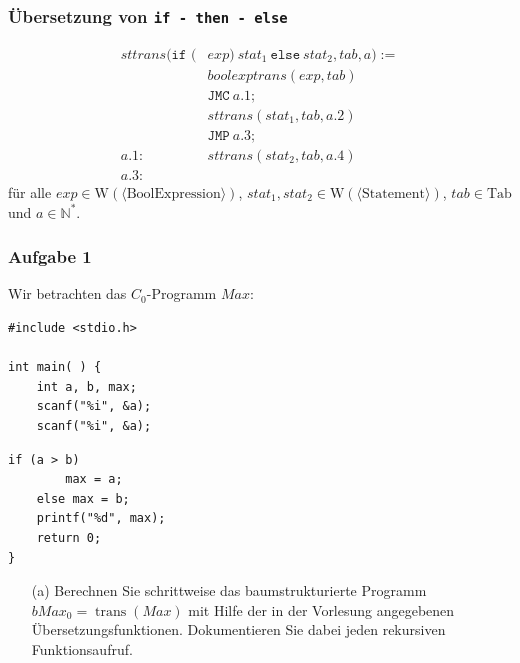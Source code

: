 \documentclass{beamer}
\DeclareMathOperator{\trans}{trans}
\begin{document}
\begin{frame} \frametitle{Übersetzung von \texttt{if - then - else}}
	\small \centering
	\begin{align*}
	sttrans( \texttt{if (} &exp \texttt{)} \ stat_1 \ \texttt{else} \ stat_2, tab, a) := \\
	& boolexptrans(exp, tab) \\
	&\texttt{JMC} \ a.1 ; \\
	& sttrans(stat_1, tab, a.2) \\
	&\texttt{JMP} \ a.3; \\
	a.1: \quad & sttrans(stat_2, tab, a.4) \\
	a.3: \quad & \phantom{.}
	\end{align*}
	für alle $exp \in \mathrm{W}(\langle \mathrm{BoolExpression} \rangle )$, $stat_1, stat_2 \in \mathrm{W}(\langle \mathrm{Statement} \rangle )$, $tab \in \mathrm{Tab}$ und $a \in \mathbb{N}^\ast$.
\end{frame}








\begin{frame}[fragile] \frametitle{Aufgabe 1}
	Wir betrachten das $C_0$-Programm $Max$:
	\begin{minipage}{\dimexpr0.5\linewidth-\fboxrule-\fboxsep}
		\begin{lstlisting}
#include <stdio.h>

int main( ) {
	int a, b, max;
	scanf("%i", &a);
	scanf("%i", &a);
		\end{lstlisting}
	\end{minipage}
	\begin{minipage}{\dimexpr0.5\linewidth-\fboxrule-\fboxsep}
		\begin{lstlisting}[firstnumber=7]
	if (a > b) 
		max = a;
	else max = b;
	printf("%d", max);
	return 0;
}
		\end{lstlisting}
	\end{minipage}

	\begin{itemize}
		\item[(a)] Berechnen Sie schrittweise das baumstrukturierte Programm $bMax_0 = \trans(Max)$ mit Hilfe der in der Vorlesung angegebenen Übersetzungsfunktionen. Dokumentieren Sie dabei jeden rekursiven Funktionsaufruf.
	\end{itemize}
\end{frame}
\end{document}
